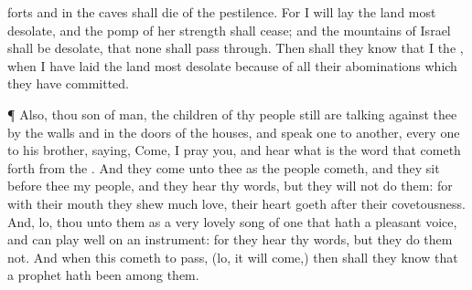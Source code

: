 {forts and in the
caves shall
die of the
pestilence.
For I will
lay the
land
most
desolate, and the
pomp of her
strength shall
cease; and the
mountains of
Israel shall be
desolate, that none shall pass
through.
Then shall they
know that I
{} the
{}, when I have
laid the
land
most
desolate because of all their
abominations which they have
committed.
\par }{\PP {}¶ Also, thou
son of
man, the
children of thy
people still are
talking
against thee by the
walls and in the
doors of the
houses, and
speak
one to
another, every
one to his
brother,
saying,
Come, I pray you, and
hear what is the
word that cometh
forth from the
{}.
And they
come unto thee as the
people
cometh, and they
sit
before thee
{} my
people, and they
hear thy
words, but they will not
do them: for with their
mouth they
shew much
love,
{} their
heart
goeth
after their
covetousness.
And, lo, thou
{} unto them as a very
lovely
song of one that hath a
pleasant
voice, and can play
well on an
instrument: for they
hear thy
words, but they
do them not.
And when this cometh to
pass, (lo, it will
come,) then shall they
know that a
prophet hath been
among them.

}
